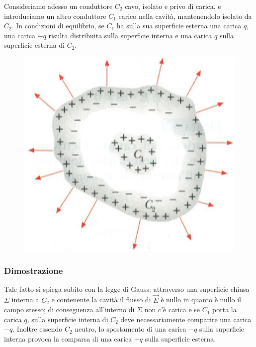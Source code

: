 \documentclass[class=book, crop=false, oneside, 12pt]{standalone}
\begin{document}
Consideriamo adesso un conduttore \(C_2\) cavo, isolato e privo di carica, e introduciamo un altro conduttore \(C_1\) carico nella cavità, mantenendolo isolato da \(C_2\). 
In condizioni di equilibrio, se \(C_1\) ha sulla sua superficie esterna una carica \(q\), una carica \(- q\) risulta distribuita sulla superficie interna e una carica \(q\) sulla superficie esterna di \(C_2\).

\begin{figure}[h]
    \includegraphics[scale=0.4]{induzione_elettrostatica_completa.png}
    \centering
    \caption{}
\end{figure}

\subsubsection{Dimostrazione}

Tale fatto si spiega subito con la legge di Gauss: attraverso una superficie chiusa \(\Sigma\) interna a \(C_2\) e contenente la cavità il flusso di \(\overrightarrow{E}\) è nullo in quanto è nullo il campo stesso; di conseguenza all'interno di \(\Sigma\) non c'è carica e se \(C_1\) porta la carica \(q\), sulla superficie interna di \(C_2\) deve necessariamente comparire una carica \(-q\). 
Inoltre essendo \(C_2\) neutro, lo spostamento di una carica \(- q\) sulla superficie interna provoca la comparsa di una carica \(+q\) sulla superficie esterna. 
\end{document}
